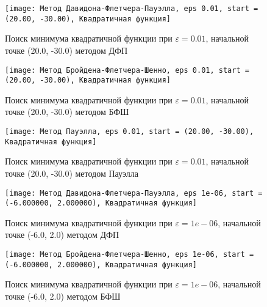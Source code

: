             \begin{figure}[H]
	        \centering
	        \texttt{[image: Метод Давидона-Флетчера-Пауэлла, eps 0.01, start = (20.00, -30.00), Квадратичная функция]}%
	        \caption{Поиск минимума квадратичной функции при $\varepsilon = 0.01$, начальной точке (20.0, -30.0) методом ДФП}
	        \vspace*{-1.2cm}
            \end{figure}
            
            \begin{figure}[H]
	        \centering
	        \texttt{[image: Метод Бройдена-Флетчера-Шенно, eps 0.01, start = (20.00, -30.00), Квадратичная функция]}%
	        \caption{Поиск минимума квадратичной функции при $\varepsilon = 0.01$, начальной точке (20.0, -30.0) методом БФШ}
	        \vspace*{-1.2cm}
            \end{figure}
            
            \begin{figure}[H]
	        \centering
	        \texttt{[image: Метод Пауэлла, eps 0.01, start = (20.00, -30.00), Квадратичная функция]}%
	        \caption{Поиск минимума квадратичной функции при $\varepsilon = 0.01$, начальной точке (20.0, -30.0) методом Пауэлла}
	        \vspace*{-1.2cm}
            \end{figure}
            
            \begin{figure}[H]
	        \centering
	        \texttt{[image: Метод Давидона-Флетчера-Пауэлла, eps 1e-06, start = (-6.000000, 2.000000), Квадратичная функция]}%
	        \caption{Поиск минимума квадратичной функции при $\varepsilon = 1e-06$, начальной точке (-6.0, 2.0) методом ДФП}
	        \vspace*{-1.2cm}
            \end{figure}
            
            \begin{figure}[H]
	        \centering
	        \texttt{[image: Метод Бройдена-Флетчера-Шенно, eps 1e-06, start = (-6.000000, 2.000000), Квадратичная функция]}%
	        \caption{Поиск минимума квадратичной функции при $\varepsilon = 1e-06$, начальной точке (-6.0, 2.0) методом БФШ}
	        \vspace*{-1.2cm}
            \end{figure}
            
